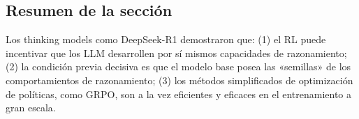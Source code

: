 \subsection{Resumen de la sección}

Los thinking models como DeepSeek-R1 demostraron que: (1) el RL puede incentivar que los LLM desarrollen por sí mismos capacidades de razonamiento; (2) la condición previa decisiva es que el modelo base posea las «semillas» de los comportamientos de razonamiento; (3) los métodos simplificados de optimización de políticas, como GRPO, son a la vez eficientes y eficaces en el entrenamiento a gran escala.
